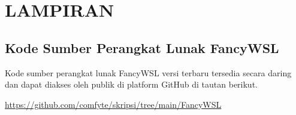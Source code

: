 \chapter*{LAMPIRAN}
\section{Kode Sumber Perangkat Lunak FancyWSL}

Kode sumber perangkat lunak FancyWSL versi terbaru tersedia secara daring dan dapat diakses oleh publik di platform GitHub di tautan berikut.

\href{https://github.com/comfyte/skripsi/tree/main/FancyWSL}{https://github.com/comfyte/skripsi/tree/main/FancyWSL}
